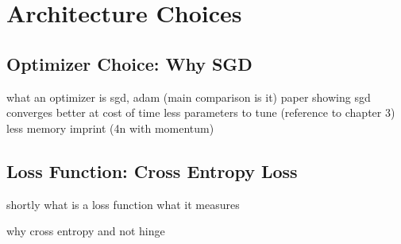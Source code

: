 \newpage
\section{Architecture Choices}
\subsection{Optimizer Choice: Why SGD}

what an optimizer is
sgd, adam (main comparison is it)
paper showing sgd converges better at cost of time
less parameters to tune (reference to chapter 3)
less memory imprint (4n with momentum)


\subsection{Loss Function: Cross Entropy Loss}

shortly what is a loss function
what it measures

why cross entropy and not hinge

